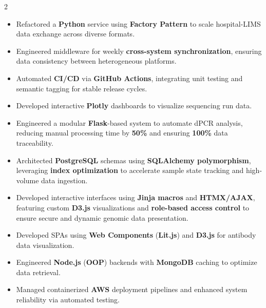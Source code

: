 \documentclass[10pt,a4paper,ragged2e,withhyper]{altacv}
\newcommand{\strong}[1]{\textcolor{Gunmetal}{\textbf{#1}}}
\begin{document}
\begin{paracol}{2}

\begin{itemize}
    \item Refactored a \strong{Python} service using \strong{Factory Pattern} to scale hospital-LIMS data exchange across diverse formats.
    \item Engineered middleware for weekly \strong{cross-system synchronization}, ensuring data consistency between heterogeneous platforms.
    \item Automated \strong{CI/CD} via \strong{GitHub Actions}, integrating unit testing and semantic tagging for stable release cycles.
    \item Developed interactive \strong{Plotly} dashboards to visualize sequencing run data.
\end{itemize}

\divider

\begin{itemize}
    \item Engineered a modular \strong{Flask}-based system to automate dPCR analysis, reducing manual processing time by \strong{50\%} and ensuring \strong{100\%} data traceability.
    \item Architected \strong{PostgreSQL} schemas using \strong{SQLAlchemy polymorphism}, leveraging \strong{index optimization} to accelerate sample state tracking and high-volume data ingestion.
    \item Developed interactive interfaces using \strong{Jinja macros} and \strong{HTMX/AJAX}, featuring custom \strong{D3.js} visualizations and \strong{role-based access control} to ensure secure and dynamic genomic data presentation.
\end{itemize}



\divider

\begin{itemize}
    \item Developed SPAs using \strong{Web Components} (\strong{Lit.js}) and \strong{D3.js} for antibody data visualization.
    \item Engineered \strong{Node.js} (\strong{OOP}) backends with \strong{MongoDB} caching to optimize data retrieval.
    \item Managed containerized \strong{AWS} deployment pipelines and enhanced system reliability via automated testing.
\end{itemize}


\end{paracol}
\end{document}
